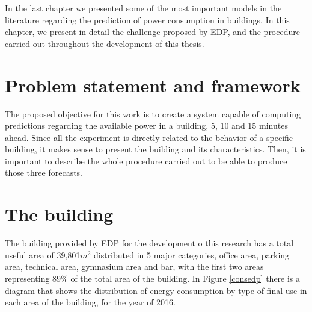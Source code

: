 \cleardoublepage
\label{chap:architecture}


In the last chapter we presented some of the most important models in the literature regarding the prediction of power consumption in buildings. In this chapter, we present in detail the challenge proposed by \ac{EDP}, and the procedure carried out throughout the development of this thesis.

\section{Problem statement and framework}\label{chap3:sec:problem_statement}

The proposed objective for this work is to create a system capable of computing predictions regarding the available power in a building, 5, 10 and 15 minutes ahead. Since all the experiment is directly related to the behavior of a specific building, it makes sense to present the building and its characteristics. Then, it is important to describe the whole procedure carried out to be able to produce those three forecasts.

\section{The building}\label{chap3:sec:building}

The building provided by \ac{EDP} for the development o this research has a total useful area of 39,801$m^2$ distributed in 5 major categories, office area, parking area, technical area, gymnasium area and bar, with the first two areas representing 89\% of the total area of the building. In Figure \ref{consedp} there is a diagram that shows the distribution of energy consumption by type of final use in each area of the building, for the year of 2016.

